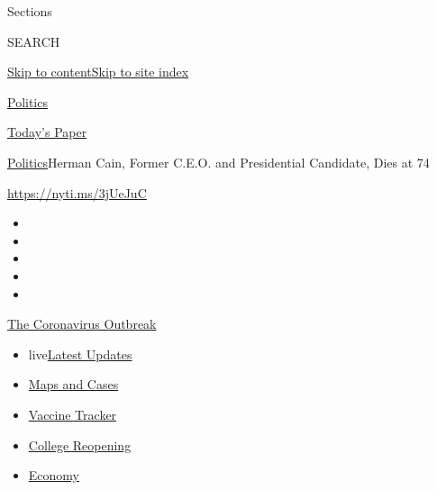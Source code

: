 Sections

SEARCH

\protect\hyperlink{site-content}{Skip to
content}\protect\hyperlink{site-index}{Skip to site index}

\href{https://www.nytimes.com/section/politics}{Politics}

\href{https://myaccount.nytimes.com/auth/login?response_type=cookie\&client_id=vi}{}

\href{https://www.nytimes.com/section/todayspaper}{Today's Paper}

\href{/section/politics}{Politics}\textbar{}Herman Cain, Former C.E.O.
and Presidential Candidate, Dies at 74

\url{https://nyti.ms/3jUeJuC}

\begin{itemize}
\item
\item
\item
\item
\item
\end{itemize}

\href{https://www.nytimes.com/news-event/coronavirus?action=click\&pgtype=Article\&state=default\&region=TOP_BANNER\&context=storylines_menu}{The
Coronavirus Outbreak}

\begin{itemize}
\tightlist
\item
  live\href{https://www.nytimes.com/2020/08/03/world/coronavirus-covid-19.html?action=click\&pgtype=Article\&state=default\&region=TOP_BANNER\&context=storylines_menu}{Latest
  Updates}
\item
  \href{https://www.nytimes.com/interactive/2020/us/coronavirus-us-cases.html?action=click\&pgtype=Article\&state=default\&region=TOP_BANNER\&context=storylines_menu}{Maps
  and Cases}
\item
  \href{https://www.nytimes.com/interactive/2020/science/coronavirus-vaccine-tracker.html?action=click\&pgtype=Article\&state=default\&region=TOP_BANNER\&context=storylines_menu}{Vaccine
  Tracker}
\item
  \href{https://www.nytimes.com/2020/08/02/us/covid-college-reopening.html?action=click\&pgtype=Article\&state=default\&region=TOP_BANNER\&context=storylines_menu}{College
  Reopening}
\item
  \href{https://www.nytimes.com/live/2020/08/03/business/stock-market-today-coronavirus?action=click\&pgtype=Article\&state=default\&region=TOP_BANNER\&context=storylines_menu}{Economy}
\end{itemize}

